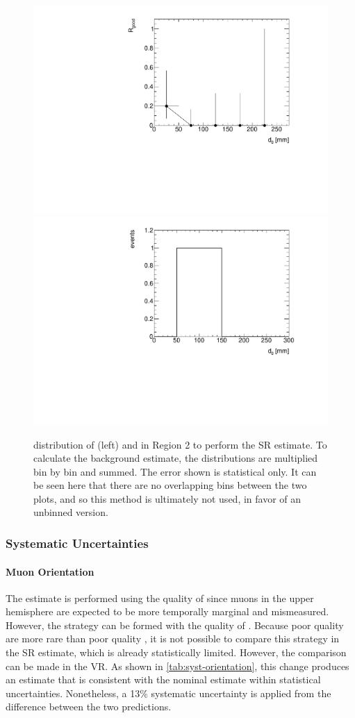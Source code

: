 \begin{figure}[htbp]
\centering
\includegraphics[width=.48\textwidth]{figures/cosmics/d0_SR_v4_rgood.pdf}
\includegraphics[width=.48\textwidth]{figures/cosmics/d0_SR_v4_2mu.pdf}
\caption{\absdz distribution of \rgood (left) and \mt in Region 2 to perform the SR estimate. To calculate the background estimate, the distributions are multiplied bin by bin and summed. The error shown is statistical only. It can be seen here that there are no overlapping bins between the two plots, and so this method is ultimately not used, in favor of an unbinned version.}
\label{fig:SR-rgood}
\end{figure}

\subsubsection{\label{sec:cos_syst}Systematic Uncertainties}

\paragraph{Muon Orientation}

The estimate is performed using the quality of \mt since muons in the upper hemisphere are expected to be more temporally marginal and mismeasured. However, the strategy can be formed with the quality of \mb. Because poor quality \mb are more rare than poor quality \mt, it is not possible to compare this strategy in the SR estimate, which is already statistically limited. However, the comparison can be made in the VR. As shown in \autoref{tab:syst-orientation}, this change produces an estimate that is consistent with the nominal estimate within statistical uncertainties. Nonetheless, a 13\% systematic uncertainty is applied from the difference between the two predictions.

